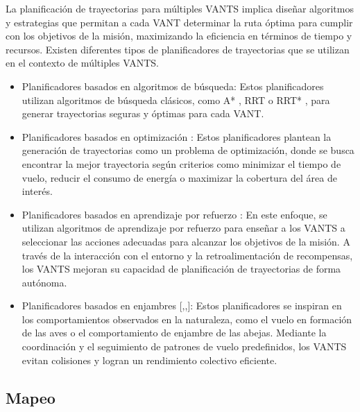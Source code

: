 \documentclass[sigconf]{acmart}
\begin{document}
La planificación de trayectorias para múltiples VANTS implica diseñar algoritmos y estrategias que permitan a cada VANT determinar la ruta óptima para cumplir con los objetivos de la misión, maximizando la eficiencia en términos de tiempo y recursos. Existen diferentes tipos de planificadores de trayectorias que se utilizan en el contexto de múltiples VANTS.

\begin{itemize}
  
\item Planificadores basados en algoritmos de búsqueda: Estos planificadores utilizan algoritmos de búsqueda clásicos, como A* \cite{Astar}, RRT \cite{RRT} o RRT* \cite{RRTstar}, para generar trayectorias seguras y óptimas para cada VANT.

\item Planificadores basados en optimización \cite{UAVOpt}: Estos planificadores plantean la generación de trayectorias como un problema de optimización, donde se busca encontrar la mejor trayectoria según criterios como minimizar el tiempo de vuelo, reducir el consumo de energía o maximizar la cobertura del área de interés.
  
\item Planificadores basados en aprendizaje por refuerzo \cite{DRL}: En este enfoque, se utilizan algoritmos de aprendizaje por refuerzo para enseñar a los VANTS a seleccionar las acciones adecuadas para alcanzar los objetivos de la misión. A través de la interacción con el entorno y la retroalimentación de recompensas, los VANTS mejoran su capacidad de planificación de trayectorias de forma autónoma.

\item Planificadores basados en enjambres [,,]: Estos planificadores se inspiran en los comportamientos observados en la naturaleza, como el vuelo en formación de las aves o el comportamiento de enjambre de las abejas. Mediante la coordinación y el seguimiento de patrones de vuelo predefinidos, los VANTS evitan colisiones y logran un rendimiento colectivo eficiente.
  
\end{itemize}

\subsection*{Mapeo}
\end{document}
